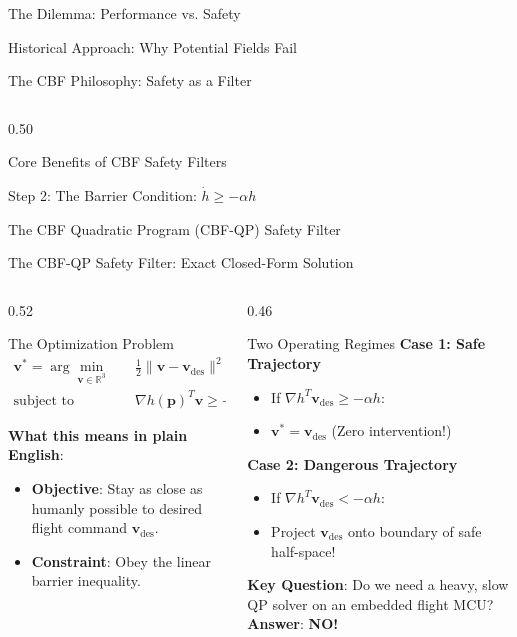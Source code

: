 \documentclass[aspectratio=169,10pt]{beamer}
\begin{document}
\begin{frame}{The Dilemma: Performance vs. Safety}
\begin{frame}{Historical Approach: Why Potential Fields Fail}
\begin{frame}{The CBF Philosophy: Safety as a Filter}
\begin{column}{0.50\textwidth}
\begin{exampleblock}{Core Benefits of CBF Safety Filters}
\begin{frame}{Step 2: The Barrier Condition: $\dot{h} \ge -\alpha h$}
\begin{frame}{The CBF Quadratic Program (CBF-QP) Safety Filter}
\begin{frame}{The CBF-QP Safety Filter: Exact Closed-Form Solution}
\begin{columns}[T]
\begin{column}{0.52\textwidth}
      \begin{block}{The Optimization Problem}
        \begin{align*}
          \mathbf{v}^* = \arg\min_{\mathbf{v} \in \mathbb{R}^3} \quad & \frac{1}{2} \|\mathbf{v} - \mathbf{v}_{\mathrm{des}}\|^2 \\
          \text{subject to} \quad & \nabla h(\mathbf{p})^T \mathbf{v} \ge -\alpha h(\mathbf{p})
        \end{align*}
      \end{block}

      \textbf{What this means in plain English}:
      \begin{itemize}
        \item \textbf{Objective}: Stay as close as humanly possible to desired flight command $\mathbf{v}_{\mathrm{des}}$.
        \item \textbf{Constraint}: Obey the linear barrier inequality.
      \end{itemize}
    \end{column}

    \begin{column}{0.46\textwidth}
      \begin{exampleblock}{Two Operating Regimes}
        \textbf{Case 1: Safe Trajectory}
        \begin{itemize}
          \item If $\nabla h^T \mathbf{v}_{\mathrm{des}} \ge -\alpha h$:
          \item $\mathbf{v}^* = \mathbf{v}_{\mathrm{des}}$ (Zero intervention!)
        \end{itemize}
        \vspace{0.3em}
        \textbf{Case 2: Dangerous Trajectory}
        \begin{itemize}
          \item If $\nabla h^T \mathbf{v}_{\mathrm{des}} < -\alpha h$:
          \item Project $\mathbf{v}_{\mathrm{des}}$ onto boundary of safe half-space!
        \end{itemize}
      \end{exampleblock}

      \vspace{0.3em}
      \small \textbf{Key Question}: Do we need a heavy, slow QP solver on an embedded flight MCU?
      \textbf{Answer}: \textbf{NO!}
    \end{column}
  \end{columns}
\end{frame}


\end{frame}
\end{frame}
\end{exampleblock}
\end{column}
\end{frame}
\end{frame}
\end{frame}
\end{document}
